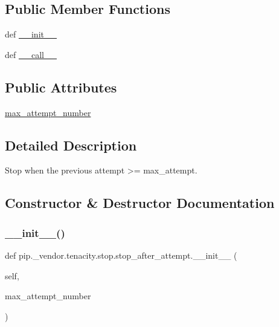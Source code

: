 \subsection*{Public Member Functions}
\begin{DoxyCompactItemize}
\item 
def \hyperlink{classpip_1_1__vendor_1_1tenacity_1_1stop_1_1stop__after__attempt_af7ab4d5f54da91f2814473f8796e8f3d}{\+\_\+\+\_\+init\+\_\+\+\_\+}
\item 
def \hyperlink{classpip_1_1__vendor_1_1tenacity_1_1stop_1_1stop__after__attempt_a2a2650da1bb6fc7e158353987dd05519}{\+\_\+\+\_\+call\+\_\+\+\_\+}
\end{DoxyCompactItemize}
\subsection*{Public Attributes}
\begin{DoxyCompactItemize}
\item 
\hyperlink{classpip_1_1__vendor_1_1tenacity_1_1stop_1_1stop__after__attempt_ae710a6b8594b3ceb1a1a6221a79795b1}{max\+\_\+attempt\+\_\+number}
\end{DoxyCompactItemize}


\subsection{Detailed Description}
\begin{DoxyVerb}Stop when the previous attempt >= max_attempt.\end{DoxyVerb}
 

\subsection{Constructor \& Destructor Documentation}
\mbox{\label{classpip_1_1__vendor_1_1tenacity_1_1stop_1_1stop__after__attempt_af7ab4d5f54da91f2814473f8796e8f3d}} 
\subsubsection{\texorpdfstring{\+\_\+\+\_\+init\+\_\+\+\_\+()}{\_\_init\_\_()}}
{\footnotesize\ttfamily def pip.\+\_\+vendor.\+tenacity.\+stop.\+stop\+\_\+after\+\_\+attempt.\+\_\+\+\_\+init\+\_\+\+\_\+ (\begin{DoxyParamCaption}\item[{}]{self,  }\item[{}]{max\+\_\+attempt\+\_\+number }\end{DoxyParamCaption})}



